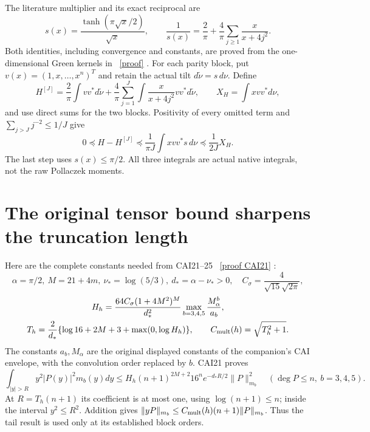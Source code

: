 \documentclass[11pt]{article}
\begin{document}
The literature multiplier and its exact reciprocal are
\[
 s(x)=\frac{\tanh(\pi\sqrt x/2)}{\sqrt x},\qquad
 \frac1{s(x)}=\frac2\pi+\frac4\pi\sum_{j\ge1}\frac{x}{x+4j^2}.
\]
Both identities, including convergence and constants, are proved from
the one-dimensional Green kernels in \cite{PP}%
~\href{https://github.com/KokunoYumeto/zeta-function-research-reader/blob/5992ad50c0f2a06921f1fcaded7b4e38097c0739/workbenches/splitzero-tandem/continuations/20260920-original-kernel-mixed-determinants/providers/PARITY_POLLACZEK_NATIVE_RECEIVER.tex\#L1}{[proof]}%
{}. For each parity block,
put $v(x)=(1,x,\ldots,x^n)^T$ and retain the actual tilt
$d\widetilde\nu=s\,d\nu$. Define
\[
 H^{[J]}=\frac2\pi\int vv^*d\widetilde\nu
 +\frac4\pi\sum_{j=1}^J\int\frac{x}{x+4j^2}vv^*d\widetilde\nu,
 \qquad X_H=\int xvv^*d\nu,
\]
and use direct sums for the two blocks. Positivity of every omitted
term and $\sum_{j>J}j^{-2}\le1/J$ give
\begin{equation}\tag{TR1}\label{eq:tail}
 0\preceq H-H^{[J]}\preceq\frac1{\pi J}\int xvv^*s\,d\nu
                                  \preceq\frac1{2J}X_H.
\end{equation}
The last step uses $s(x)\le\pi/2$. All three integrals are actual
native integrals, not the raw Pollaczek moments.

\section{The original tensor bound sharpens the truncation length}
Here are the complete constants needed from CAI21--25 \cite{CAI}%
~\href{https://github.com/KokunoYumeto/zeta-function-research-reader/blob/487253b5b01851da5b9b98af4e146fecf1fab902/workbenches/splitzero-tandem/continuations/20260919-full-window-source-products/providers/CAI_COMPLETE_PREREQUISITE.tex\#L360}{[proof CAI21]}%
{}:
\[
 \alpha=\pi/2,\ M=21+4m,\ \nu_*=\log(5/3),\ d_* =\alpha-\nu_*>0,
 \quad C_\sigma=\frac4{\sqrt{15}\sqrt{2\pi}},
\]
\[
 \begin{gathered}
 H_h=\frac{64C_\sigma(1+4M^2)^M}{d_*^2}
             \max_{b=3,4,5}\frac{M_\alpha^b}{a_b},\\
 T_h=\frac2{d_*}\{\log16+2M+3+\max(0,\log H_h)\},\qquad
 C_{\rm mult}(h)=\sqrt{T_h^2+1}.
 \end{gathered}
\]
The constants $a_b,M_\alpha$ are the original displayed constants
of the companion's CAI envelope, with the convolution order replaced
by $b$. CAI21 proves
\[
 \int_{|y|>R}y^2|P(y)|^2m_b(y)dy
 \le H_h(n+1)^{2M+2}16^ne^{-d_*R/2}\|P\|_{m_b}^2
 \quad(\deg P\le n,\ b=3,4,5).
\]
At $R=T_h(n+1)$ its coefficient is at most one, using
$\log(n+1)\le n$; inside the interval $y^2\le R^2$. Addition gives
$\|yP\|_{m_b}\le C_{\rm mult}(h)(n+1)\|P\|_{m_b}$.
Thus the tail result is used only at its established block orders.
\end{document}
